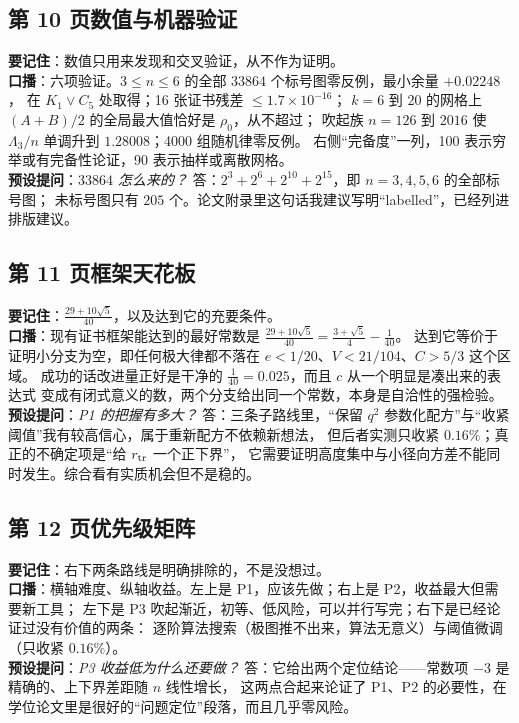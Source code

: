 \documentclass[UTF8,11pt]{ctexart}
\newcommand{\Lam}{\Lambda}
\begin{document}
\subsection*{第 10 页\quad 数值与机器验证}
\textbf{要记住}：数值只用来发现和交叉验证，从不作为证明。\\
\textbf{口播}：六项验证。$3\le n\le6$ 的全部 $33864$ 个标号图零反例，最小余量 $+0.02248$，
在 $K_1\vee C_5$ 处取得；16 张证书残差 $\le1.7\times10^{-16}$；
$k=6$ 到 $20$ 的网格上 $(A+B)/2$ 的全局最大值恰好是 $\rho_0$，从不超过；
吹起族 $n=126$ 到 $2016$ 使 $\Lam_3/n$ 单调升到 $1.28008$；4000 组随机律零反例。
右侧``完备度''一列，100 表示穷举或有完备性论证，90 表示抽样或离散网格。\\
\textbf{预设提问}：\emph{$33864$ 怎么来的？}
答：$2^3+2^6+2^{10}+2^{15}$，即 $n=3,4,5,6$ 的全部标号图；
未标号图只有 $205$ 个。论文附录里这句话我建议写明``labelled''，已经列进排版建议。

\subsection*{第 11 页\quad 框架天花板}
\textbf{要记住}：$\frac{29+10\sqrt5}{40}$，以及达到它的充要条件。\\
\textbf{口播}：现有证书框架能达到的最好常数是 $\frac{29+10\sqrt5}{40}=\frac{3+\sqrt5}{4}-\frac1{40}$。
达到它等价于证明小分支为空，即任何极大律都不落在 $e<1/20$、$V<21/104$、$C>5/3$ 这个区域。
成功的话改进量正好是干净的 $\frac1{40}=0.025$，而且 $c$ 从一个明显是凑出来的表达式
变成有闭式意义的数，两个分支给出同一个常数，本身是自洽性的强检验。\\
\textbf{预设提问}：\emph{P1 的把握有多大？}
答：三条子路线里，``保留 $q^2$ 参数化配方''与``收紧阈值''我有较高信心，属于重新配方不依赖新想法，
但后者实测只收紧 $0.16\%$；真正的不确定项是``给 $r_{\rm tr}$ 一个正下界''，
它需要证明高度集中与小径向方差不能同时发生。综合看有实质机会但不是稳的。

\subsection*{第 12 页\quad 优先级矩阵}
\textbf{要记住}：右下两条路线是明确排除的，不是没想过。\\
\textbf{口播}：横轴难度、纵轴收益。左上是 P1，应该先做；右上是 P2，收益最大但需要新工具；
左下是 P3 吹起渐近，初等、低风险，可以并行写完；右下是已经论证过没有价值的两条：
逐阶算法搜索（极图推不出来，算法无意义）与阈值微调（只收紧 $0.16\%$）。\\
\textbf{预设提问}：\emph{P3 收益低为什么还要做？}
答：它给出两个定位结论——常数项 $-3$ 是精确的、上下界差距随 $n$ 线性增长，
这两点合起来论证了 P1、P2 的必要性，在学位论文里是很好的``问题定位''段落，而且几乎零风险。
\end{document}
